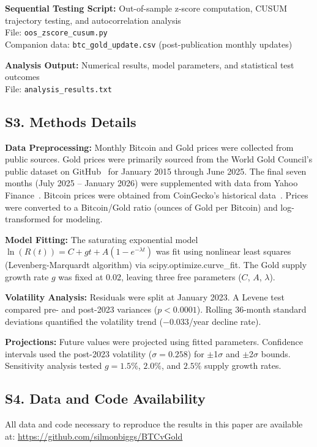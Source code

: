 \documentclass[11pt,letterpaper]{article}
\begin{document}
\textbf{Sequential Testing Script:} Out-of-sample z-score computation, CUSUM trajectory testing, and autocorrelation analysis\\
File: \texttt{oos\_zscore\_cusum.py}\\
Companion data: \texttt{btc\_gold\_update.csv} (post-publication monthly updates)

\textbf{Analysis Output:} Numerical results, model parameters, and statistical test outcomes\\
File: \texttt{analysis\_results.txt}

\subsection{S3. Methods Details}

\textbf{Data Preprocessing:} Monthly Bitcoin and Gold prices were collected from public sources. Gold prices were primarily sourced from the World Gold Council's public dataset on GitHub~\cite{wgc2025data} for January 2015 through June 2025. The final seven months (July 2025 -- January 2026) were supplemented with data from Yahoo Finance~\cite{yahoo2025}. Bitcoin prices were obtained from CoinGecko's historical data~\cite{coingecko2025}. Prices were converted to a Bitcoin/Gold ratio (ounces of Gold per Bitcoin) and log-transformed for modeling.

\textbf{Model Fitting:} The saturating exponential model $\ln(R(t)) = C + gt + A(1 - e^{-\lambda t})$ was fit using nonlinear least squares (Levenberg-Marquardt algorithm) via scipy.optimize.curve\_fit. The Gold supply growth rate $g$ was fixed at 0.02, leaving three free parameters ($C$, $A$, $\lambda$).

\textbf{Volatility Analysis:} Residuals were split at January 2023. A Levene test compared pre- and post-2023 variances ($p < 0.0001$). Rolling 36-month standard deviations quantified the volatility trend ($-0.033$/year decline rate).

\textbf{Projections:} Future values were projected using fitted parameters. Confidence intervals used the post-2023 volatility ($\sigma = 0.258$) for $\pm$1$\sigma$ and $\pm$2$\sigma$ bounds. Sensitivity analysis tested $g = 1.5\%$, $2.0\%$, and $2.5\%$ supply growth rates.

\subsection{S4. Data and Code Availability}

All data and code necessary to reproduce the results in this paper are available at: \url{https://github.com/silmonbiggs/BTCvGold}
\end{document}
